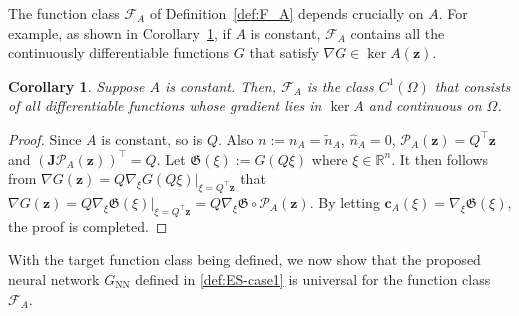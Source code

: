 \documentclass[openacc]{rsproca_new}%
\newcommand{\z}{\bm{z}}
\newtheorem{corollary}{Corollary}
\begin{document}
The function class $\mathcal{F}_A$ of Definition~\ref{def:F_A}
depends crucially on $A$.
For example, 
as shown in Corollary~\ref{cor:FA},
if $A$ is constant,
$\mathcal{F}_A$ contains 
all the continuously differentiable functions $G$
that satisfy $\nabla G \in \ker A(\z)$.

\begin{corollary} \label{cor:FA}
    Suppose $A$ is constant. 
    Then, 
    $\mathcal{F}_A$ is 
    the class $C^1(\Omega)$
    that consists of all differentiable functions whose gradient lies in $\ker A$
    and continuous on $\Omega$.
\end{corollary}
\begin{proof}
    Since $A$ is constant,
    so is $Q$.
    Also  
    $n:=n_A = \tilde{n}_A$, $\hat{n}_A = 0$,
    $\mathcal{P}_A(\z) = Q^\top \z$
    and $(\textbf{J}\mathcal{P}_A(\z))^\top= Q$.
    Let $\mathfrak{G}(\xi) := G(Q\xi)$
    where $\xi \in \mathbb{R}^n$.
    It then follows from 
    $\nabla G(\z) = Q\nabla_{\xi} G(Q\xi)\big|_{\xi = Q^\top \z}$
    that 
    $\nabla G(\z) 
    = Q\nabla_{\xi} \mathfrak{G}(\xi)\big|_{\xi=Q^\top \z}
    = Q\nabla_{\xi} \mathfrak{G} \circ \mathcal{P}_A(\z)$.
    By letting $\bm{c}_A(\xi) = \nabla_{\xi} \mathfrak{G}(\xi)$,
    the proof is completed. 
\end{proof}


With the target function class being defined,
we now show that 
the proposed neural network $G_{\text{NN}}$
defined in \eqref{def:ES-case1} 
is universal for 
the function class $\mathcal{F}_A$.
\end{document}
